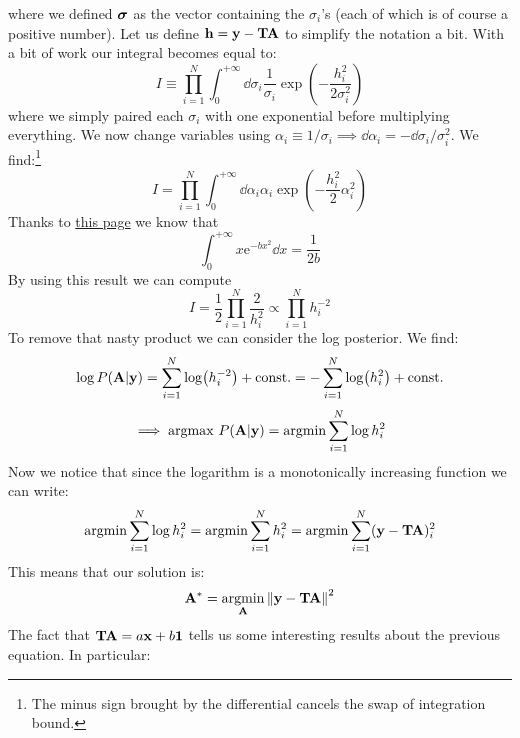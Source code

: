 \documentclass[a4paper]{article}
\newcommand{\mat}[1]{\vb{#1}}
\DeclareMathOperator*{\argmin}{argmin}
\begin{document}
where we defined $\vb*{\sigma}$ as the vector containing the $\sigma_i$'s (each of which is of course a positive number).
Let us define $\vb{h} = \vb{y} - \mat{T}\vb{A}$ to simplify the notation a bit. With a bit of work our integral becomes equal to:
\begin{equation*}
    I \equiv \prod_{i=1}^N \int_0^{+\infty} \dd{\sigma_i} \frac{1}{\sigma_i} \exp(-\frac{h_i^2}{2\sigma_i^2})
\end{equation*}
where we simply paired each $\sigma_i$ with one exponential before multiplying everything.
We now change variables using $\alpha_i \equiv 1/\sigma_i \implies \dd{\alpha_i} = -\dd{\sigma_i}/\sigma_i^2$. We find:\footnote{The minus sign brought by the differential cancels the swap of integration bound.}
\begin{equation*}
    I = \prod_{i=1}^N \int_0^{+\infty} \dd{\alpha_i} \alpha_i \exp(-\frac{h_i^2}{2}\alpha_i^2 )
\end{equation*}
Thanks to \hyperlink{https://en.wikipedia.org/wiki/Gaussian_integral}{this page} we know that
\begin{equation*}
    \int_0^{+\infty} x \mathrm{e}^{-bx^2}\dd{x} = \frac{1}{2b}
\end{equation*}
By using this result we can compute
\begin{equation*}
    I = \frac{1}{2} \prod_{i=1}^N \frac{2}{h_i^2} \propto \prod_{i=1}^N h_i^{-2}
\end{equation*}
To remove that nasty product we can consider the log posterior. We find:
\begin{equation*}
    \log P(\vb{A}|\vb{y}) = \sum_{i=1}^N \log(h_i^{-2}) + \text{const.} = -\sum_{i=1}^N \log(h_i^2) + \text{const.}
\end{equation*}
\begin{equation*}
    \implies \mathrm{argmax} \ P(\vb{A}|\vb{y}) = \argmin \sum_{i=1}^N \log h_i^2
\end{equation*}
Now we notice that since the logarithm is a monotonically increasing function we can write:
\begin{equation*}
    \argmin \sum_{i=1}^N \log h_i^2 = \argmin \sum_{i=1}^N h_i^2 = \argmin \sum_{i=1}^N (\vb{y}-\mat{T}\vb{A})_i^2
\end{equation*}
This means that our solution is:
\begin{equation*}
    \vb{A}^* = \argmin_{\vb{A}} \norm{\vb{y} - \mat{T}\vb{A}}^2
\end{equation*}
The fact that $\mat{T}\vb{A} = a\vb{x}+b\vb{1}$ tells us some interesting results about the previous equation. In particular:
\end{document}
